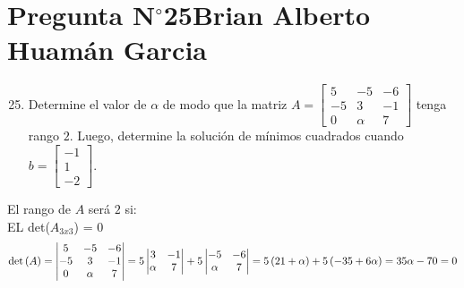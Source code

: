 \section{Pregunta N$^{\circ}$25\qquad Brian Alberto Huamán Garcia}

\begin{frame}
	\begin{enumerate}\setcounter{enumi}{24}
		\item

		      Determine el valor de $\alpha$ de modo que la matriz
		      \begin{math}
			      A=
			      \begin{bmatrix}
				      5  & -5     & -6 \\
				      -5 & 3      & -1 \\
				      0  & \alpha & 7
			      \end{bmatrix}
		      \end{math}
		      tenga rango $2$.
		      Luego, determine la solución de mínimos cuadrados cuando
		      \begin{math}
			      b=
			      \begin{bmatrix}
				      -1 \\
				      1  \\
				      -2
			      \end{bmatrix}
		      \end{math}.
	\end{enumerate}

	\begin{solution}
		El rango de $A$ será $2$ si: \\
        EL det($A_{3x3}$) = 0
		\begin{equation*}
			\det\left(A\right)=
			\begin{vmatrix}
				5  & -5     & -6 \\
				-5 & 3      & -1 \\
				0  & \alpha & 7
			\end{vmatrix}=
			5\begin{vmatrix}
				3      & -1 \\
				\alpha & 7
			\end{vmatrix}+
			5\begin{vmatrix}
				-5     & -6 \\
				\alpha & 7
			\end{vmatrix}=
			5\left(21+\alpha\right)+
			5\left(-35+6\alpha\right) = 35 \alpha - 70 = 0 \\
		\end{equation*}
  

\end{solution}
\end{frame}
